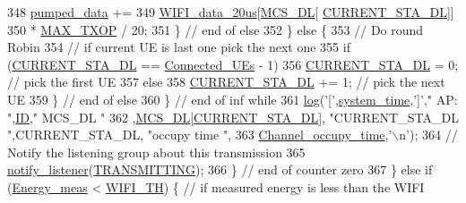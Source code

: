 \begin{DoxyCode}
348                             \hyperlink{classAP_ae7f2e09d8692bea041bbc7ff00521795}{pumped\_data} +=
349                                     \hyperlink{classAP_acbd517e31b830c7aebf62f9ea9635f93}{WIFI\_data\_20us}[\hyperlink{classAP_a7b8604e8bed67e0abef14f54ba55ec19}{MCS\_DL}[
      \hyperlink{classAP_aabddb8414a6a9ecdd51e7e2a03310eb9}{CURRENT\_STA\_DL}]]
350                                             * \hyperlink{classAP_a0952981af3bebf7dcc9fabe94875dc7b}{MAX\_TXOP} / 20;
351                         \} \textcolor{comment}{// end of else}
352                     \} \textcolor{keywordflow}{else} \{
353                         \textcolor{comment}{// Do round Robin}
354                         \textcolor{comment}{// if current UE is last one pick the next one}
355                         \textcolor{keywordflow}{if} (\hyperlink{classAP_aabddb8414a6a9ecdd51e7e2a03310eb9}{CURRENT\_STA\_DL} == \hyperlink{classAP_af0d927a781e8776c18758508a6845c85}{Connected\_UEs} - 1)
356                             \hyperlink{classAP_aabddb8414a6a9ecdd51e7e2a03310eb9}{CURRENT\_STA\_DL} = 0; \textcolor{comment}{// pick the first UE}
357                         \textcolor{keywordflow}{else}
358                             \hyperlink{classAP_aabddb8414a6a9ecdd51e7e2a03310eb9}{CURRENT\_STA\_DL} += 1; \textcolor{comment}{// pick the next UE}
359                     \} \textcolor{comment}{// end of else}
360                 \} \textcolor{comment}{// end of inf while}
361                 \hyperlink{AP_8cpp_aa5af53510557e77a03906c5016ebe66f}{log}(\textcolor{charliteral}{'['},\hyperlink{AP_8cpp_aaa03a568dc1d9d3391286ea24b9cfb63}{system\_time},\textcolor{charliteral}{']'},\textcolor{stringliteral}{" AP: "},\hyperlink{classAP_a5f6f67357a37b369b8967ce354ede5dd}{ID},\textcolor{stringliteral}{" MCS\_DL "}
362                 ,\hyperlink{classAP_a7b8604e8bed67e0abef14f54ba55ec19}{MCS\_DL}[\hyperlink{classAP_aabddb8414a6a9ecdd51e7e2a03310eb9}{CURRENT\_STA\_DL}], \textcolor{stringliteral}{"CURRENT\_STA\_DL "},CURRENT\_STA\_DL, \textcolor{stringliteral}{"occupy time
       "},
363                 \hyperlink{classAP_a2c168786c0400fa590bed7fabbca741e}{Channel\_occupy\_time},\textcolor{charliteral}{'\(\backslash\)n'});
364                   \textcolor{comment}{// Notify the listening group about this transmission}
365                 \hyperlink{classAP_a2fb3ca1e5be18f3542ca091215ac95a2}{notify\_listener}(\hyperlink{common_8h_a3d8f1d48238737396cad8ac23238d226}{TRANSMITTING});
366             \} \textcolor{comment}{// end of counter zero}
367         \} \textcolor{keywordflow}{else} \textcolor{keywordflow}{if} (\hyperlink{classAP_a71f625e0df8f494e53ab6e27a2e96bd9}{Energy\_meas} < \hyperlink{classAP_a42bd4510621509219054811e7350bf29}{WIFI\_TH}) \{ \textcolor{comment}{// if measured energy is less than the WIFI
}
\end{DoxyCode}
